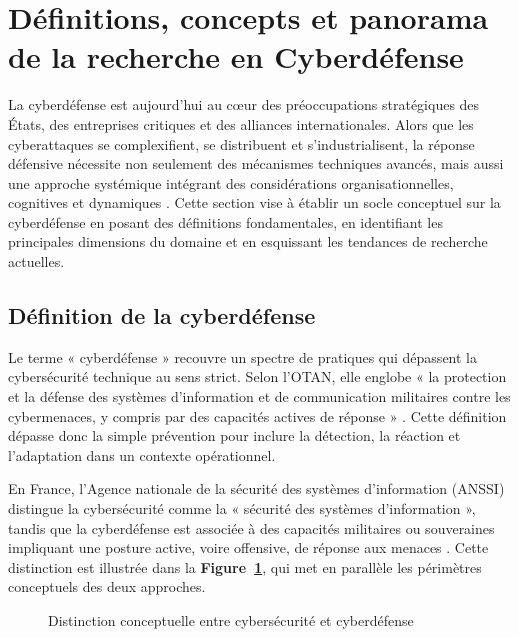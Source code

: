 \documentclass[ twoside,openright,titlepage,numbers=noenddot,headinclude,%
                footinclude=true,cleardoublepage=empty,abstractoff, %
                BCOR=5mm,paper=a4,fontsize=11pt,%
                french,american,%
                ]{scrreprt}
\begin{document}
\section{Définitions, concepts et panorama de la recherche en Cyberdéfense}

La cyberdéfense est aujourd'hui au cœur des préoccupations stratégiques des États, des entreprises critiques et des alliances internationales. Alors que les cyberattaques se complexifient, se distribuent et s'industrialisent, la réponse défensive nécessite non seulement des mécanismes techniques avancés, mais aussi une approche systémique intégrant des considérations organisationnelles, cognitives et dynamiques \cite{rudner2020state, nicolas2021souverainete, ota2019cybersecurity}. Cette section vise à établir un socle conceptuel sur la cyberdéfense en posant des définitions fondamentales, en identifiant les principales dimensions du domaine et en esquissant les tendances de recherche actuelles.

\subsection*{Définition de la cyberdéfense}

Le terme « cyberdéfense » recouvre un spectre de pratiques qui dépassent la cybersécurité technique au sens strict. Selon l'OTAN, elle englobe « la protection et la défense des systèmes d'information et de communication militaires contre les cybermenaces, y compris par des capacités actives de réponse » \cite{nato-cyberdefense}. Cette définition dépasse donc la simple prévention pour inclure la détection, la réaction et l'adaptation dans un contexte opérationnel.

En France, l'Agence nationale de la sécurité des systèmes d'information (ANSSI) distingue la cybersécurité comme la « sécurité des systèmes d'information », tandis que la cyberdéfense est associée à des capacités militaires ou souveraines impliquant une posture active, voire offensive, de réponse aux menaces \cite{anssi2015guide}. Cette distinction est illustrée dans la \textbf{Figure~\ref{fig:cyberdefense-vs-cybersecurite}}, qui met en parallèle les périmètres conceptuels des deux approches.

\begin{figure}[H]
    \centering
    \caption{Distinction conceptuelle entre cybersécurité et cyberdéfense}
    \label{fig:cyberdefense-vs-cybersecurite}
\end{figure}
\end{document}
